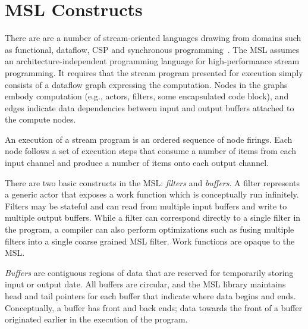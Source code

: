 \section{MSL Constructs}

There are are a number of stream-oriented languages drawing from
domains such as functional, dataflow, CSP and synchronous
programming~\cite{survey97}. The MSL assumes an architecture-independent
programming language for high-performance stream programming. It
requires that the stream program presented for execution simply
consists of a dataflow graph expressing the computation. Nodes in the
graphs embody computation (e.g., actors, filters, some encapsulated
code block), and edges indicate data dependencies between
input and output buffers attached to the compute nodes.

An execution of a stream program is an ordered sequence of node
firings. Each node follows a set of execution steps that consume a
number of items from each input channel and produce a number of items
onto each output channel.

There are two basic constructs in the MSL: \emph{filters} and
\emph{buffers}. A filter represents a generic actor that exposes a
work function which is conceptually run infinitely. Filters may be
stateful and can read from multiple input buffers and write to multiple
output buffers. While a filter can correspond directly to a
single filter in the program, a compiler can also perform
optimizations such as fusing multiple filters into a single
coarse grained MSL filter. Work functions are opaque to the MSL.

\emph{Buffers} are contiguous regions of data that are reserved for
temporarily storing input or output date. All buffers are circular,
and the MSL library maintains head and tail pointers for each buffer
that indicate where data begins and ends. Conceptually, a buffer has
front and back ends; data towards the front of a buffer originated
earlier in the execution of the program.


